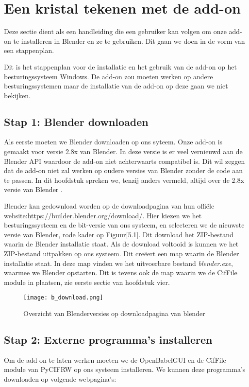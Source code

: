 \section{Een kristal tekenen met de add-on}
Deze sectie dient als een handleiding die een gebruiker kan volgen om onze add-on te installeren in Blender en ze te gebruiken. Dit gaan we doen in de vorm van een stappenplan. 
\par
Dit is het stappenplan voor de installatie en het gebruik van de add-on op het besturingssysteem Windows. De add-on zou moeten werken op andere besturingssystemen maar de installatie van de add-on op deze gaan we niet bekijken. 

\subsection{Stap 1: Blender downloaden}
Als eerste moeten we Blender downloaden op ons syteem. Onze add-on is gemaakt voor versie 2.8x van Blender. In deze versie is er veel vernieuwd aan de Blender API waardoor de add-on niet achterwaarts compatibel is. Dit wil zeggen dat de add-on niet zal werken op oudere versies van Blender zonder de code aan te passen. In dit hoofdstuk spreken we, tenzij anders vermeld, altijd over de 2.8x versie van Blender .  
\par
Blender kan gedownload worden op de downloadpagina van hun offiële website:\url{https://builder.blender.org/download/}. Hier kiezen we het besturingssysteem en de bit-versie van ons systeem, en selecteren we de nieuwste versie van Blender, rode kader op Figuur[5.1].  Dit download het ZIP-bestand waarin de Blender installatie staat. Als de download voltooid is kunnen we het ZIP-bestand uitpakken op ons systeem. Dit creëert een map waarin de Blender installatie staat. In deze map vinden we het uitvoerbare bestand \textit{blender.exe}, waarmee we Blender opstarten. Dit is tevens ook de map waarin we de CifFile module in plaatsen, zie eerste sectie van hoofdstuk vier.      

\begin{figure}[h]
\begin{center}
\texttt{[image: b\_download.png]}
\caption{Overzicht van Blenderversies op downloadpagina van blender}
\end{center}
\end{figure}
 
\subsection{Stap 2: Externe programma's installeren}
Om de add-on te laten werken moeten we de OpenBabelGUI en de CifFile module van PyCIFRW op ons systeem installeren. We kunnen deze programma's downloaden op volgende webpagina's:

